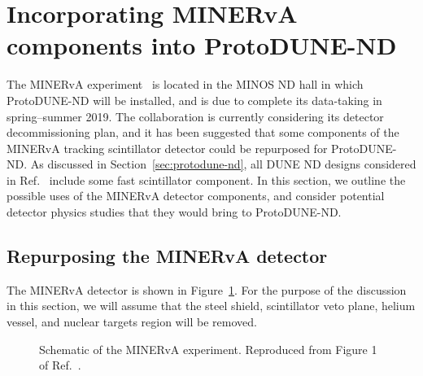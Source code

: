 \section{Incorporating MINERvA components into ProtoDUNE-ND}
\label{sec:MINERvA}

The MINERvA experiment~\cite{minerva-nim} is located in the MINOS ND hall in which ProtoDUNE-ND will be installed, and is due to complete its data-taking in spring--summer 2019. The collaboration is currently considering its detector decommissioning plan, and it has been suggested that some components of the MINERvA tracking scintillator detector could be repurposed for ProtoDUNE-ND. As discussed in Section~\ref{sec:protodune-nd}, all DUNE ND designs considered in Ref.~\cite{dune_ndcsg} include some fast scintillator component. In this section, we outline the possible uses of the MINERvA detector components, and consider potential detector physics studies that they would bring to ProtoDUNE-ND.

\subsection{Repurposing the MINERvA detector}
The MINERvA detector is shown in Figure~\ref{fig:minerva_detector}. For the purpose of the discussion in this section, we will assume that the steel shield, scintillator veto plane, helium vessel, and nuclear targets region will be removed. 
\begin{figure}[htb]
  \centering
  \caption{Schematic of the MINERvA experiment. Reproduced from Figure 1 of Ref.~\cite{minerva-nim}.}
  \label{fig:minerva_detector}
\end{figure}

